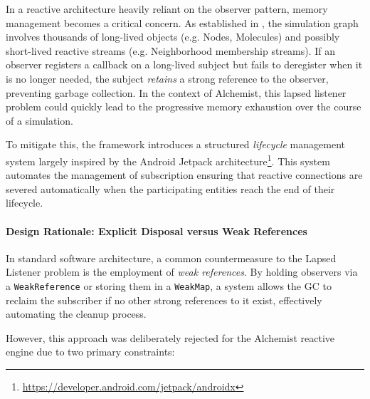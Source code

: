 In a reactive architecture heavily reliant on the observer pattern, memory
management becomes a critical concern. As established in
, the simulation graph involves
thousands of long-lived objects (e.g. Nodes, Molecules) and possibly
short-lived reactive streams (e.g. Neighborhood membership streams). If an
observer registers a callback on a long-lived subject but fails to deregister
when it is no longer needed, the subject \emph{retains} a strong reference to
the observer, preventing garbage collection. In the context of Alchemist, this
lapsed listener problem could quickly lead to the progressive memory
exhaustion over the course of a simulation.

To mitigate this, the framework introduces a structured \emph{lifecycle}
management system largely inspired by the Android Jetpack
architecture\footnote{\url{https://developer.android.com/jetpack/androidx}}.
This system automates the management of subscription ensuring that reactive
connections are severed automatically when the participating entities reach the
end of their lifecycle.

\paragraph{Design Rationale: Explicit Disposal versus Weak References} In
standard software architecture, a common countermeasure to the Lapsed Listener
problem is the employment of \emph{weak references}. By holding observers via a
\linebreak\texttt{WeakReference} or storing them in a \texttt{WeakMap}, a system allows
the \ac{GC} to reclaim the subscriber if no other strong references
to it exist, effectively automating the cleanup process.

However, this approach was deliberately rejected for the Alchemist reactive
engine due to two primary constraints:


